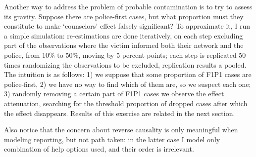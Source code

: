 \documentclass[]{interact}
\theoremstyle{plain}%
\theoremstyle{definition}
\theoremstyle{remark}
\newcommand\citep{\parencite}
\begin{document}
	Another way to address the problem of probable contamination is to try to assess its gravity. Suppose there are police-first cases, but what proportion must they constitute to make `counselors' effect falsely significant? To approximate it, I run a simple simulation: re-estimations are done iteratively, on each step excluding part of the observations where the victim informed both their network and the police, from 10\% to 50\%, moving by 5 percent points; each step is replicated 50 times randomizing the observations to be excluded, replication results a pooled. The intuition is as follows: 1) we suppose that some proportion of F1P1 cases are police-first, 2) we have no way to find which of them are, so we suspect each one; 3) randomly removing a certain part of F1P1 cases we observe the effect attenuation, searching for the threshold proportion of dropped cases after which the effect disappears. Results of this exercise are related in the next section.
	
	Also notice that the concern about reverse causality is only meaningful when modeling reporting, but not path taken: in the latter case I model only combination of help options used, and their order is irrelevant. 
	
	
\end{document}
